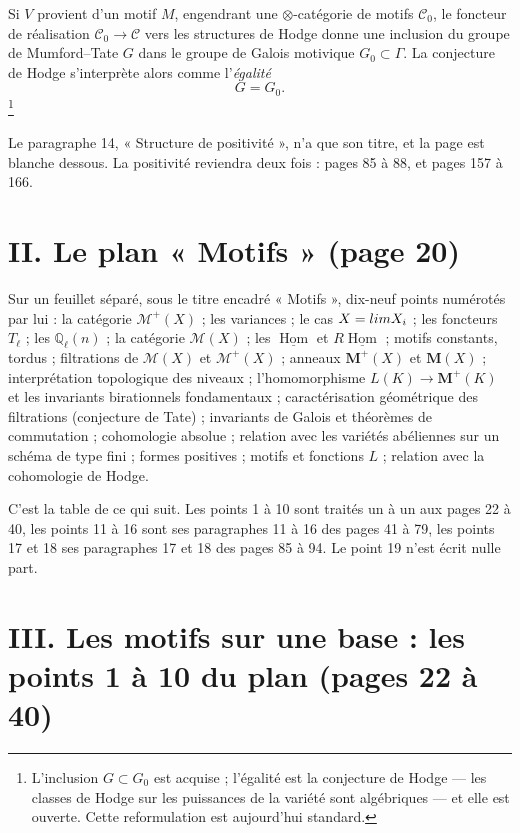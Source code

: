 \documentclass[11pt,a4paper]{article}
\begin{document}
Si $V$ provient d'un motif $M$, engendrant une $\otimes$-catégorie de motifs
$\mathcal{C}_{0}$, le foncteur de réalisation $\mathcal{C}_{0} \to \mathcal{C}$
vers les structures de Hodge donne une inclusion du groupe de Mumford--Tate
$G$ dans le groupe de Galois motivique $G_{0} \subset \Gamma$. La conjecture de
Hodge s'interprète alors comme l'\emph{égalité}
\[
G = G_{0} .
\]\footnote{L'inclusion $G \subset G_{0}$ est acquise ; l'égalité est la
conjecture de Hodge --- les classes de Hodge sur les puissances de la variété
sont algébriques --- et elle est ouverte. Cette reformulation est aujourd'hui
standard.}

Le paragraphe 14, « Structure de positivité », n'a que son titre, et la page est
blanche dessous. La positivité reviendra deux fois : pages 85 à 88, et pages 157
à 166.

\section*{II. Le plan « Motifs » (page 20)}

Sur un feuillet séparé, sous le titre encadré « Motifs », dix-neuf points
numérotés par lui : la catégorie $\mathcal{M}^{+}(X)$ ; les variances ; le cas
$X = \varprojlim X_{i}$ ; les foncteurs $T_{\ell}$ ; les $\mathbb{Q}_{\ell}(n)$ ; la
catégorie $\mathcal{M}(X)$ ; les $\underline{\operatorname{Hom}}$ et
$R\underline{\operatorname{Hom}}$ ; motifs constants, tordus ; filtrations de
$\mathcal{M}(X)$ et $\mathcal{M}^{+}(X)$ ; anneaux $\mathbf{M}^{+}(X)$ et
$\mathbf{M}(X)$ ; interprétation topologique des niveaux ; l'homomorphisme
$L(K) \to \mathbf{M}^{+}(K)$ et les invariants birationnels fondamentaux ;
caractérisation géométrique des filtrations (conjecture de Tate) ; invariants de
Galois et théorèmes de commutation ; cohomologie absolue ; relation avec les
variétés abéliennes sur un schéma de type fini ; formes positives ; motifs et
fonctions $L$ ; relation avec la cohomologie de Hodge.

C'est la table de ce qui suit. Les points 1 à 10 sont traités un à un aux pages
22 à 40, les points 11 à 16 sont ses paragraphes 11 à 16 des pages 41 à 79, les
points 17 et 18 ses paragraphes 17 et 18 des pages 85 à 94. Le point 19 n'est
écrit nulle part.

\section*{III. Les motifs sur une base : les points 1 à 10 du plan (pages 22 à 40)}
\end{document}
